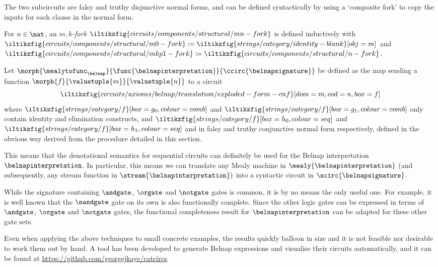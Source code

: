 The two subcircuits are falsy and truthy disjunctive normal forms, and can be
defined syntactically by using a `composite fork' to copy the inputs for each
clause in the normal form.

\begin{definition}\label{def:mk-fork}
    For \(n \in \nat\), an \emph{\(m,k\)-fork}
    \(\iltikzfig{circuits/components/structural/mn-fork}\)
    is defined
    inductively with \(
    \iltikzfig{circuits/components/structural/m0-fork} \coloneqq
    \iltikzfig{strings/category/identity-blank}[obj=m]
    \) and \(
    \iltikzfig{circuits/components/structural/mkp1-fork} \coloneqq
    \iltikzfig{circuits/components/structural/n-fork}
    \).
\end{definition}

\begin{definition}
    Let \(\morph{\mealytofunc_\belnap}{\func{\belnapinterpretation}}{\ccirc{\belnapsignature}}\)
    be defined as the map sending a function \(\morph{f}{\valuetuple{m}}{\valuetuple{n}}\)
    to a circuit \[
        \iltikzfig{circuits/axioms/belnap/translation/exploded-form-cnf}[dom=m,cod=n,box=f]
    \] where \(
    \iltikzfig{strings/category/f}[box=g_0,colour=comb]
    \) and \(
    \iltikzfig{strings/category/f}[box=g_1,colour=comb]
    \) only contain identity and elimination constructs, and \(
    \iltikzfig{strings/category/f}[box=h_0,colour=seq]
    \) and \(
    \iltikzfig{strings/category/f}[box=h_1,colour=seq]
    \) and in falsy and truthy conjunctive normal form respectively, defined
    in the obvious way derived from the procedure detailed in this section.
\end{definition}

This means that the denotational semantics for sequential circuits can
definitely be used for the Belnap interpretation \(\belnapinterpretation\).
In particular, this means we can translate any Mealy machine in
\(\mealy{\belnapinterpretation}\) (and subsequently, any stream function in
\(\stream{\belnapinterpretation})\) into a syntactic circuit in
\(\scirc{\belnapsignature}\).

While the signature containing \(\andgate\), \(\orgate\) and \(\notgate\) gates
is common, it is by no means the only useful one.
For example, it is well known that the \(\nandgate\) gate on its own is also
functionally complete.
Since the other logic gates can be expressed in terms of \(\andgate\),
\(\orgate\) and \(\notgate\) gates, the functional completeness result for
\(\belnapinterpretation\) can be adapted for these other gate sets.

Even when applying the above techniques to small concrete examples,
the results quickly balloon in size and it is not feasible nor desirable to work
them out by hand.
A tool has been developed to generate Belnap expressions and
visualise their circuits automatically, and it can be found at
\url{https://github.com/georgejkaye/catcircs}.